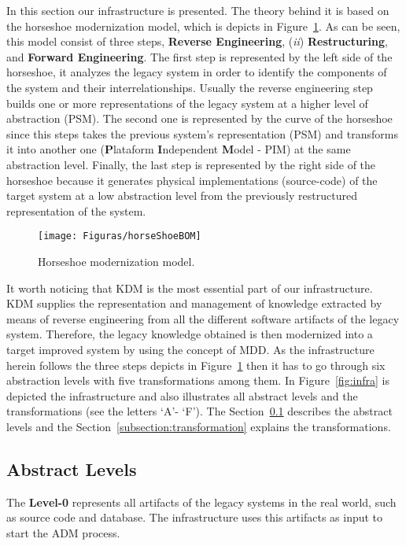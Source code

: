 In this section our infrastructure is presented. The theory behind it is based on the horseshoe modernization model, which is depicts in Figure~\ref{fig:horseshoe}. As can be seen, this model consist of three steps, \textbf{Reverse Engineering}, (\textit{ii}) \textbf{Restructuring}, and \textbf{Forward Engineering}. The first step is represented by the left side of the horseshoe, it analyzes the legacy system in order to identify the components of the system and their interrelationships. Usually the reverse engineering step builds one or more representations of the legacy system at a higher level of abstraction (PSM). The second one is represented by the curve of the horseshoe since this steps takes the previous system's representation (PSM) and transforms it into another one (\textbf{P}lataform \textbf{I}ndependent \textbf{M}odel - PIM) at the same abstraction level. Finally, the last step is represented by the right side of the horseshoe because it generates physical implementations (source-code) of the target system at a low abstraction level from the previously restructured representation of the system.

\begin{figure}[!h]
\centering
 \texttt{[image: Figuras/horseShoeBOM]}
\caption{Horseshoe modernization model.}
\label{fig:horseshoe}
\end{figure}

It worth noticing that KDM is the most essential part of our infrastructure. KDM supplies the representation and management of knowledge extracted by means of reverse engineering from all the different software artifacts of the legacy system. Therefore, the legacy knowledge obtained is then modernized into a target improved system by using the concept of MDD. As the infrastructure herein follows the three steps depicts in Figure~\ref{fig:horseshoe} then it has to go through six abstraction levels with five transformations among them. In Figure~\ref{fig:infra} is depicted the infrastructure and also illustrates all abstract levels and the transformations (see the letters `A'- `F'). The Section~\ref{subsection:abstract_level} describes the abstract levels and the Section~\ref{subsection:transformation} explains the transformations.

\subsection{Abstract Levels}\label{subsection:abstract_level}
The \textbf{Level-0} represents all artifacts of the legacy systems in the real world, such as source code and database. The infrastructure uses this artifacts as input to start the ADM process.


